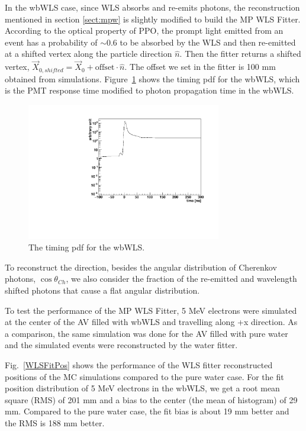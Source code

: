 In the wbWLS case, since WLS absorbs and re-emits photons, the reconstruction mentioned in section \ref{sect:mpw} is slightly modified to build the MP WLS Fitter. According to the optical property of PPO, the prompt light emitted from an event has a probability of $\sim$0.6 to be absorbed by the WLS and then re-emitted at a shifted vertex along the particle direction $\hat{n}$. Then the fitter returns a shifted vertex, $\vec{X}_{0,shifted}=\vec{X}_0+\mathrm{offset}\cdot\hat{n}$. The offset we set in the fitter is 100 mm obtained from simulations. Figure~\ref{WLS_pdf} shows the timing pdf for the wbWLS, which is the PMT response time modified to photon propagation time in the wbWLS.
\begin{figure}[htbp]	
	\centering		
	\begin{minipage}[b]{0.5\textwidth}			
		\includegraphics[height=6cm]{WLSTime_pdf.pdf}			
	\end{minipage}%
	\caption{\label{WLS_pdf} The timing pdf for the wbWLS.}	
\end{figure}

To reconstruct the direction, besides the angular distribution of Cherenkov photons, $\cos\theta_{Ch}$, we also consider the fraction of the re-emitted and wavelength shifted photons that cause a flat angular distribution.

To test the performance of the MP WLS Fitter, 5 MeV electrons were simulated at the center of the AV filled with wbWLS and travelling along +x direction. As a comparison, the same simulation was done for the AV filled with pure water and the simulated events were reconstructed by the water fitter.

Fig.~\ref{WLSFitPos} shows the performance of the WLS fitter reconstructed positions of the MC simulations compared to the pure water case. For the fit position distribution of 5 MeV electrons in the wbWLS, we get a root mean square (RMS) of 201 mm and a bias to the center (the mean of histogram) of 29 mm. Compared to the pure water case, the fit bias is about 19 mm better and the RMS is 188 mm better.

